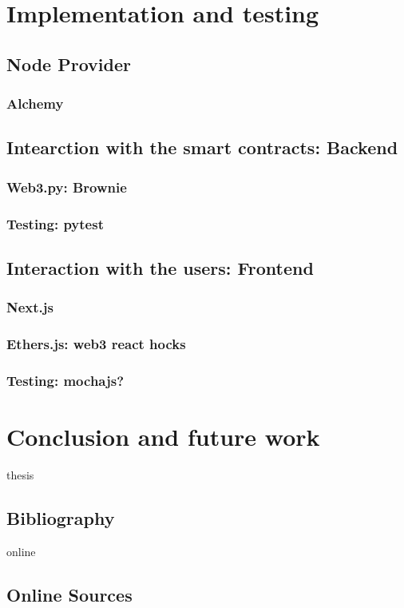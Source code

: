 \documentclass[11pt,a4paper]{report}
\begin{document}
\chapter{Implementation and testing} \label{ch:impl}
\section{Node Provider}
\subsection{Alchemy}
\section{Intearction with the smart contracts: Backend}
\subsection{Web3.py: Brownie}
\subsection{Testing: pytest}
\section{Interaction with the users: Frontend}
\subsection{Next.js}
\subsection{Ethers.js: web3 react hocks}
\subsection{Testing: mochajs?}
\chapter{Conclusion and future work} \label{ch:conclusion}
\newpage

\begin{btSect}{thesis} %
\section*{Bibliography}
\btPrintCited
\end{btSect}
\begin{btSect}{online}
\section*{Online Sources}
\btPrintCited
\end{btSect}
\end{document}
